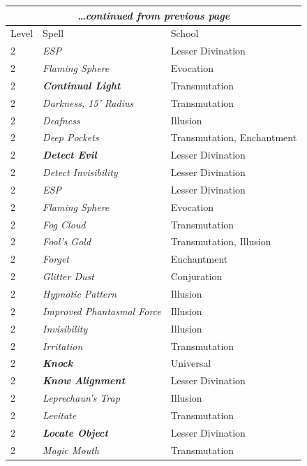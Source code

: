 \begin{multicols}{2}
\noindent
\begin{tabular}{|p{}|p{}|p{}|}
\multicolumn{3}{c}{\textit{\ldots continued from previous page}} \\
\hline
Level	& Spell	& School \\
\hline\hline
\rowcolor[gray]{.9}2	& \textit{ESP}	& Lesser Divination \\
2	& \textit{Flaming Sphere}	& Evocation \\
\rowcolor[gray]{.9}2	& \textbf{\textit{Continual Light}}	& Transmutation \\
2	& \textit{Darkness, 15' Radius}	& Transmutation \\
\rowcolor[gray]{.9}2	& \textit{Deafness}	& Illusion \\
2	& \textit{Deep Pockets}	& Transmutation, Enchantment \\
\rowcolor[gray]{.9}2	& \textbf{\textit{Detect Evil}}	& Lesser Divination \\
2	& \textit{Detect Invisibility}	& Lesser Divination \\
\rowcolor[gray]{.9}2	& \textit{ESP}	& Lesser Divination \\
2	& \textit{Flaming Sphere}	& Evocation \\
\rowcolor[gray]{.9}2	& \textit{Fog Cloud}	& Transmutation \\
2	& \textit{Fool's Gold}	& Transmutation, Illusion \\
\rowcolor[gray]{.9}2	& \textit{Forget}	& Enchantment \\
2	& \textit{Glitter Dust}	& Conjuration \\
\rowcolor[gray]{.9}2	& \textit{Hypnotic Pattern}	& Illusion \\
2	& \textit{Improved Phantasmal Force}	& Illusion \\
\rowcolor[gray]{.9}2	& \textit{Invisibility}	& Illusion \\
2	& \textit{Irritation}	& Transmutation \\
\rowcolor[gray]{.9}2	& \textbf{\textit{Knock}}	& Universal \\
2	& \textbf{\textit{Know Alignment}}	& Lesser Divination \\
\rowcolor[gray]{.9}2	& \textit{Leprechaun's Trap}	& Illusion \\
2	& \textit{Levitate}	& Transmutation \\
\rowcolor[gray]{.9}2	& \textbf{\textit{Locate Object}}	& Lesser Divination \\
2	& \textit{Magic Mouth}	& Transmutation \\

\end{tabular}
\end{multicols}
